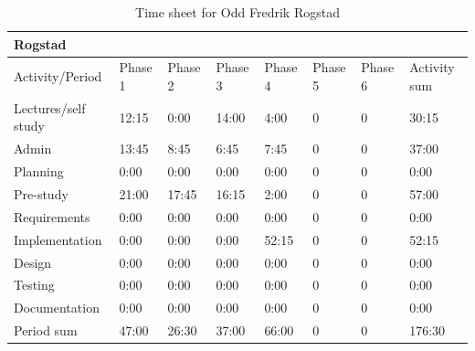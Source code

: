 \documentclass[11pt]{book}
\begin{document}
\begin{table}[H]
\centering
\begin{tabular}{| l | l | l | l | l | l | l | l |}
    \hline
    Rogstad             &          &          &          &          &             &             &                 \\ \hline                        
    Activity/Period     & Phase 1  & Phase 2  & Phase  3 & Phase 4  & Phase 5     & Phase 6     & Activity sum    \\ \hline
    Lectures/self study & 12:15    & 0:00     & 14:00    & 4:00     & 0           & 0           & 30:15        \\ \hline
    Admin               & 13:45    & 8:45     & 6:45     & 7:45     & 0           & 0           & 37:00        \\ \hline
    Planning            & 0:00     & 0:00     & 0:00     & 0:00     & 0           & 0           & 0:00         \\ \hline
    Pre-study           & 21:00    & 17:45    & 16:15    & 2:00     & 0           & 0           & 57:00        \\ \hline
    Requirements        & 0:00     & 0:00     & 0:00     & 0:00     & 0           & 0           & 0:00         \\ \hline
    Implementation      & 0:00     & 0:00     & 0:00     & 52:15    & 0           & 0           & 52:15        \\ \hline
    Design              & 0:00     & 0:00     & 0:00     & 0:00     & 0           & 0           & 0:00         \\ \hline
    Testing             & 0:00     & 0:00     & 0:00     & 0:00     & 0           & 0           & 0:00         \\ \hline
    Documentation       & 0:00     & 0:00     & 0:00     & 0:00     & 0           & 0           & 0:00         \\ \hline
    Period sum          & 47:00    & 26:30    & 37:00    & 66:00    & 0           & 0           & 176:30       \\ \hline
\end{tabular}
\caption{Time sheet for Odd Fredrik Rogstad}
\label{tab:appendix_timesheets_odd}
\end{table}
\end{document}
